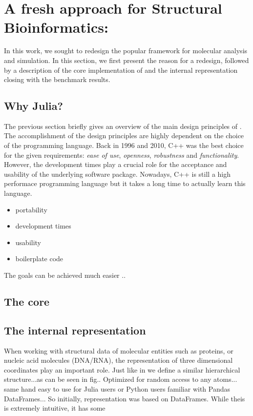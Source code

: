 
\section{ A fresh approach for Structural Bioinformatics: \biochem}
\label{sec:juliaball}
In this work, we sought to redesign the popular \ball framework for molecular analysis and simulation. In this section, we first present the reason for a redesign, followed by a description of the core implementation of \biochem and the internal representation closing with the benchmark results. 

\subsection{Why Julia?}

The previous section briefly gives an overview of the main design principles of \ball. The accomplishment of the design principles are highly dependent on the choice of the programming language. Back in 1996 and 2010, C++ was the best choice for the given requirements: \textit{ease of use}, \textit{openness}, \textit{robustness} and \textit{functionality}.
However, the development times play a crucial role for the acceptance and usability of the underlying software package. Nowadays, C++ is still a high performace programming language but it takes a long time to actually learn this language. 

\begin{itemize}
	\item portability
	\item development times
	\item usability
	\item boilerplate code
\end{itemize}


The goals can be achieved much easier ..
\subsection{The core}

\subsection{The internal representation}
When working with structural data of molecular entities such as proteins, or nucleic acid molecules (DNA/RNA), the representation of three dimensional coordinates play an important role. 
Just like in \ball we define a similar hierarchical structure...as can be seen in fig..
Optimized for random access to any atoms...
same hand easy to use for Julia users or Python users familiar with Pandas DataFrames...
So initially, representation was based on DataFrames. While theis is extremely intuitive, it has some 

